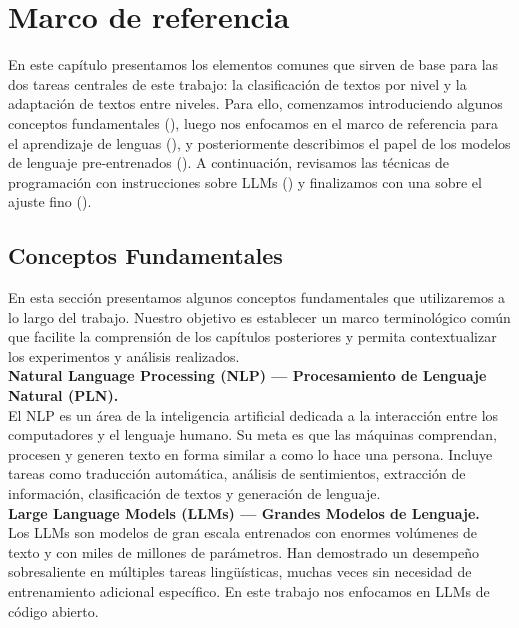 \section{Marco de referencia} \label{sec:marco_ref}
En este capítulo presentamos los elementos comunes que sirven de base para las dos tareas centrales de este trabajo: la clasificación de textos por nivel y la adaptación de textos entre niveles. Para ello, comenzamos introduciendo algunos conceptos fundamentales (), luego nos enfocamos en el marco de referencia para el aprendizaje de lenguas (), y posteriormente describimos el papel de los modelos de lenguaje pre-entrenados (). A continuación, revisamos las técnicas de programación con instrucciones sobre LLMs () y finalizamos con una  sobre el ajuste fino ().

\subsection{Conceptos Fundamentales}\label{subsec:concep_fund}
En esta sección presentamos algunos conceptos fundamentales que utilizaremos a lo largo del trabajo. Nuestro objetivo es establecer un marco terminológico común que facilite la comprensión de los capítulos posteriores y permita contextualizar los experimentos y análisis realizados.\\

\noindent\textbf {Natural Language Processing (NLP) — Procesamiento de Lenguaje Natural (PLN).\cite{nlp}} \\ El NLP es un área de la inteligencia artificial dedicada a la interacción entre los computadores y el lenguaje humano. Su meta es que las máquinas comprendan, procesen y generen texto en forma similar a como lo hace una persona. Incluye tareas como traducción automática, análisis de sentimientos, extracción de información, clasificación de textos y generación de lenguaje. \\

\noindent\textbf {Large Language Models (LLMs) — Grandes Modelos de Lenguaje.\cite{llms}} \\
Los LLMs son modelos de gran escala entrenados con enormes volúmenes de texto y con miles de millones de parámetros. Han demostrado un desempeño sobresaliente en múltiples tareas lingüísticas, muchas veces sin necesidad de entrenamiento adicional específico. En este trabajo nos enfocamos en LLMs de código abierto. \\

